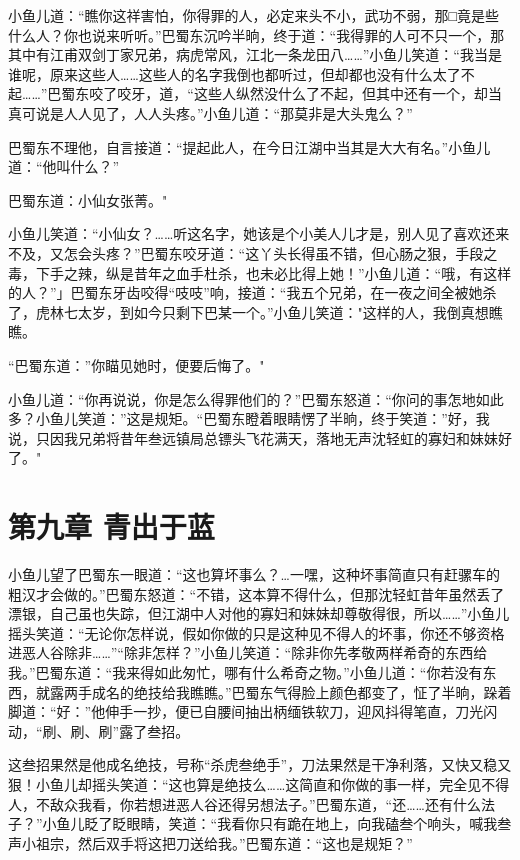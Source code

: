 \documentclass[12pt,oneside]{book}
\begin{document}
小鱼儿道：``瞧你这祥害怕，你得罪的人，必定来头不小，武功不弱，那□竟是些什么人？你也说来听听。''巴蜀东沉吟半晌，终于道：``我得罪的人可不只一个，那其中有江甫双剑丁家兄弟，病虎常风，江北一条龙田八\ldots\ldots{}''小鱼儿笑道：``我当是谁呢，原来这些人\ldots\ldots 这些人的名字我倒也都听过，但却都也没有什么太了不起\ldots\ldots{}''巴蜀东咬了咬牙，道，``这些人纵然没什么了不起，但其中还有一个，却当真可说是人人见了，人人头疼。''小鱼儿道：``那莫非是大头鬼么？''

巴蜀东不理他，自言接道：``提起此人，在今日江湖中当其是大大有名。''小鱼儿道：``他叫什么？''

巴蜀东道：小仙女张菁。"

小鱼儿笑道：``小仙女？\ldots\ldots 听这名字，她该是个小美人儿才是，别人见了喜欢还来不及，又怎会头疼？''巴蜀东咬牙道：``这丫头长得虽不错，但心肠之狠，手段之毒，下手之辣，纵是昔年之血手杜杀，也未必比得上她！''小鱼儿道：``哦，有这样的人？''」巴蜀东牙齿咬得``吱吱''响，接道：``我五个兄弟，在一夜之间全被她杀了，虎林七太岁，到如今只剩下巴某一个。''小鱼儿笑道："这样的人，我倒真想瞧瞧。

``巴蜀东道：''你瞄见她时，便要后悔了。"

小鱼儿道：``你再说说，你是怎么得罪他们的？''巴蜀东怒道：``你问的事怎地如此多？小鱼儿笑道：''这是规矩。``巴蜀东瞪着眼睛愣了半晌，终于笑道：''好，我说，只因我兄弟将昔年叁远镇局总镖头飞花满天，落地无声沈轻虹的寡妇和妹妹好了。"

\hypertarget{ux7b2cux4e5dux7ae0-ux9752ux51faux4e8eux84dd}{%
\chapter{第九章
青出于蓝}\label{ux7b2cux4e5dux7ae0-ux9752ux51faux4e8eux84dd}}

小鱼儿望了巴蜀东一眼道：``这也算坏事么？\ldots 一嘿，这种坏事简直只有赶骡车的粗汉才会做的。''巴蜀东怒道：``不错，这本算不得什么，但那沈轻虹昔年虽然丢了漂银，自己虽也失踪，但江湖中人对他的寡妇和妹妹却尊敬得很，所以\ldots\ldots{}''小鱼儿摇头笑道：``无论你怎样说，假如你做的只是这种见不得人的坏事，你还不够资格进恶人谷除非\ldots\ldots{}''``除非怎样？''小鱼儿笑道：``除非你先孝敬两样希奇的东西给我。''巴蜀东道：``我来得如此匆忙，哪有什么希奇之物。''小鱼儿道：``你若没有东西，就露两手成名的绝技给我瞧瞧。''巴蜀东气得脸上颜色都变了，怔了半晌，跺着脚道：``好：''他伸手一抄，便已自腰间抽出柄缅铁软刀，迎风抖得笔直，刀光闪动，``刷、刷、刷''露了叁招。

这叁招果然是他成名绝技，号称``杀虎叁绝手''，刀法果然是干净利落，又快又稳又狠！小鱼儿却摇头笑道：``这也算是绝技么\ldots\ldots 这简直和你做的事一样，完全见不得人，不敌众我看，你若想进恶人谷还得另想法子。''巴蜀东道，``还\ldots\ldots 还有什么法子？''小鱼儿眨了眨眼睛，笑道：``我看你只有跪在地上，向我磕叁个响头，喊我叁声小祖宗，然后双手将这把刀送给我。''巴蜀东道：``这也是规矩？''
\end{document}

